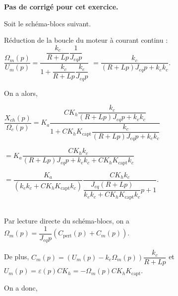 \normaltrue \difficilefalse \tdifficilefalse
\correctiontrue


\setcounter{question}{0}
\ifcorrection
\else
\textbf{Pas de corrigé pour cet exercice.}
\fi

\ifprof
\else
Soit le schéma-blocs suivant. 
\begin{figure}[H]
\centering
{}
\end{figure}
\fi

\ifprof
Réduction de la boucle du moteur à courant continu : 
$\dfrac{\Omega_m(p)}{U_m(p)}=\dfrac{\dfrac{k_c}{R+Lp}\dfrac{1}{J_{eq}p}}{1+\dfrac{k_c}{R+Lp}\dfrac{k_e}{J_{eq}p}}$
$=\dfrac{k_c}{\left(R+Lp\right)J_{eq}p+k_ek_c}$.

On a alors, 

$
\dfrac{X_{ch}(p)}{\Omega_c(p)} =
K_a  \dfrac{CK_h \dfrac{k_c}{\left(R+Lp\right)J_{eq}p+k_ek_c}}{1+CK_hK_{\text{capt}} \dfrac{k_c}{\left(R+Lp\right)J_{eq}p+k_ek_c}}
$ 

$
=
K_a \dfrac{CK_h k_c}{\left(R+Lp\right)J_{eq}p+k_ek_c+CK_hK_{\text{capt}} k_c}
$

$
=
\dfrac{K_a }{\left( k_ek_c+CK_hK_{\text{capt}} k_c\right)} \dfrac{CK_h k_c}{\dfrac{J_{eq}\left(R+Lp\right)}{k_ek_c+CK_hK_{\text{capt}} k_c}p+1}
$.

\else
\fi

\ifprof ~\\
Par lecture directe du schéma-blocs, on a 
$\Omega_m(p) = \dfrac{1}{J_{eq}p}\left(C_{\text{pert}}(p) + C_m(p)\right)$.

De plus, 
$C_m(p) = \left(U_m(p)-k_e\Omega_m(p)\right) \dfrac{k_c}{R+Lp}$
 et $U_m(p)=\varepsilon(p) C K_h = -\Omega_m(p) C K_h K_{\text{capt}}$.
 
 On a donc, 
 
